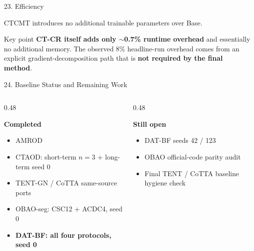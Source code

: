 \documentclass[aspectratio=169,11pt]{beamer}
\begin{document}
\begin{frame}{23. Efficiency}
{CTCMT introduces no additional trainable parameters over Base.
\par
}

\vspace{-0.03cm}

\begin{block}{Key point}
\fontsize{5.8}{6.4}\selectfont
\textbf{CT-CR itself adds only $\sim$0.7\% runtime overhead}
and essentially no additional memory.
The observed $8\%$ headline-run overhead comes from an explicit
gradient-decomposition path that is \textbf{not required by the final method}.
\end{block}

\end{frame}

\begin{frame}{24. Baseline Status and Remaining Work}

\scriptsize

\begin{columns}[T,onlytextwidth]

\begin{column}{0.48\textwidth}

\textbf{Completed}

\begin{itemize}
    \setlength{\itemsep}{1pt}
    \item AMROD
    \item CTAOD:
          short-term $n=3$ + long-term seed 0
    \item TENT-GN / CoTTA same-source ports
    \item OBAO-seg:
          CSC12 + ACDC4, seed 0
    \item \textbf{DAT-BF: all four protocols, seed 0}
\end{itemize}

\end{column}

\begin{column}{0.48\textwidth}

\textbf{Still open}

\begin{itemize}
    \setlength{\itemsep}{1pt}
    \item DAT-BF seeds 42 / 123
    \item OBAO official-code parity audit
    \item Final TENT / CoTTA baseline hygiene check
\end{itemize}


\end{column}
\end{columns}
\end{frame}
\end{document}
